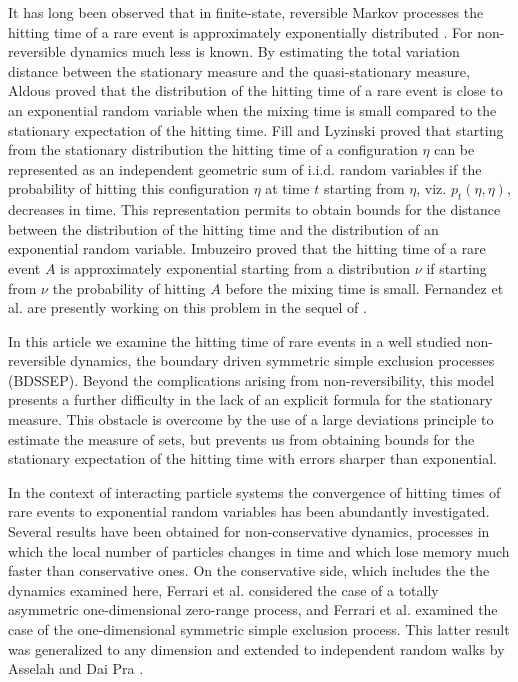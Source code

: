 \documentclass[reqno]{amsart}
\begin{document}
It has long been observed that in finite-state, reversible Markov
processes the hitting time of a rare event is approximately
exponentially distributed \cite{k1, b1, ab1, ab2}. For non-reversible
dynamics much less is known. By estimating the total variation
distance between the stationary measure and the quasi-stationary
measure, Aldous \cite{a1} proved that the distribution of the hitting
time of a rare event is close to an exponential random variable when
the mixing time is small compared to the stationary expectation of the
hitting time. Fill and Lyzinski \cite{fl1} proved that starting from
the stationary distribution the hitting time of a configuration $\eta$
can be represented as an independent geometric sum of i.i.d. random
variables if the probability of hitting this configuration $\eta$ at
time $t$ starting from $\eta$, viz. $p_t(\eta,\eta)$, decreases in
time. This representation permits to obtain bounds for the distance
between the distribution of the hitting time and the distribution of
an exponential random variable. Imbuzeiro \cite{i1} proved that the
hitting time of a rare event $A$ is approximately exponential starting
from a distribution $\nu$ if starting from $\nu$ the probability of
hitting $A$ before the mixing time is small.  Fernandez et
al. \cite{fmns1} are presently working on this problem in the sequel
of \cite{bbf1}.

In this article we examine the hitting time of rare events in a well
studied non-reversible dynamics, the boundary driven symmetric simple
exclusion processes (BDSSEP). Beyond the complications arising from
non-reversibility, this model presents a further difficulty in the
lack of an explicit formula for the stationary measure. This obstacle
is overcome by the use of a large deviations principle to estimate the
measure of sets, but prevents us from obtaining bounds for the
stationary expectation of the hitting time with errors sharper than
exponential.

In the context of interacting particle systems the convergence of
hitting times of rare events to exponential random variables has been
abundantly investigated. Several results have been obtained for
non-conservative dynamics, processes in which the local number of
particles changes in time and which lose memory much faster than
conservative ones. On the conservative side, which includes the the
dynamics examined here, Ferrari et al. \cite{fgl1} considered the case
of a totally asymmetric one-dimensional zero-range process, and
Ferrari et al. \cite{fgl2} examined the case of the one-dimensional
symmetric simple exclusion process. This latter result was generalized
to any dimension and extended to independent random walks by Asselah
and Dai Pra \cite{ap2, ap3}.
\end{document}
